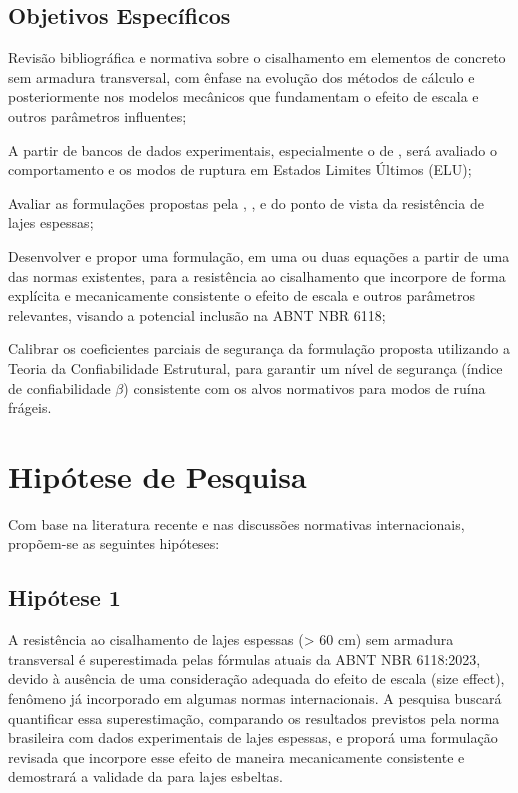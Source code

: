 \section{Objetivos Específicos}
\begin{alineas}
	\item Revisão bibliográfica e normativa sobre o cisalhamento em elementos de concreto sem armadura transversal, com ênfase na evolução dos métodos de cálculo e posteriormente nos modelos mecânicos que fundamentam o efeito de escala e outros parâmetros influentes;
	\item A partir de bancos de dados experimentais, especialmente o de \textcite{Kuchma2019}, será avaliado o comportamento e os modos de ruptura em Estados Limites Últimos (ELU);
	\item Avaliar as formulações propostas pela \textcite{NBR6118:2023}, \textcite{CEN2004}, \textcite{ACI318:2019} e \textcite{FIB:2020} do ponto de vista da resistência de lajes espessas;
	\item Desenvolver e propor uma formulação, em uma ou duas equações a partir de uma das normas existentes, para a resistência ao cisalhamento que incorpore de forma explícita e mecanicamente consistente o efeito de escala e outros parâmetros relevantes, visando a potencial inclusão na ABNT NBR 6118;
	\item Calibrar os coeficientes parciais de segurança da formulação proposta utilizando a Teoria da Confiabilidade Estrutural, para garantir um nível de segurança (índice de confiabilidade $\beta$) consistente com os alvos normativos para modos de ruína frágeis.
\end{alineas}	


\chapter{Hipótese de Pesquisa}
Com base na literatura recente e nas discussões normativas internacionais, propõem-se as seguintes hipóteses:

\section{Hipótese 1}
A resistência ao cisalhamento de lajes espessas (> 60 cm) sem armadura transversal é superestimada pelas fórmulas atuais da ABNT NBR 6118:2023, devido à ausência de uma consideração adequada do efeito de escala (size effect), fenômeno já incorporado em algumas normas internacionais. A pesquisa buscará quantificar essa superestimação, comparando os resultados previstos pela norma brasileira com dados experimentais de lajes espessas, e proporá uma formulação revisada que incorpore esse efeito de maneira mecanicamente consistente e demostrará a validade da \textcite{NBR6118:2023} para lajes esbeltas.
